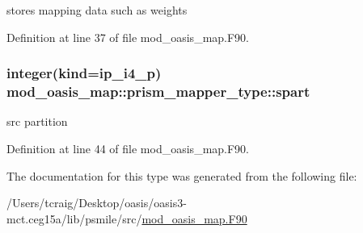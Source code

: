 stores mapping data such as weights 



Definition at line 37 of file mod\+\_\+oasis\+\_\+map.\+F90.

\hypertarget{structmod__oasis__map_1_1prism__mapper__type_a26d7374d018e7d5b5b87d91eef9e02a9}{
\subsubsection[{spart}]{\setlength{\rightskip}{0pt plus 5cm}integer(kind=ip\+\_\+i4\+\_\+p) mod\+\_\+oasis\+\_\+map\+::prism\+\_\+mapper\+\_\+type\+::spart\hspace{0.3cm}{\ttfamily [private]}}}\label{structmod__oasis__map_1_1prism__mapper__type_a26d7374d018e7d5b5b87d91eef9e02a9}


src partition 



Definition at line 44 of file mod\+\_\+oasis\+\_\+map.\+F90.



The documentation for this type was generated from the following file\+:\begin{DoxyCompactItemize}
\item 
/\+Users/tcraig/\+Desktop/oasis/oasis3-\/mct.\+ceg15a/lib/psmile/src/\hyperlink{mod__oasis__map_8_f90}{mod\+\_\+oasis\+\_\+map.\+F90}\end{DoxyCompactItemize}
